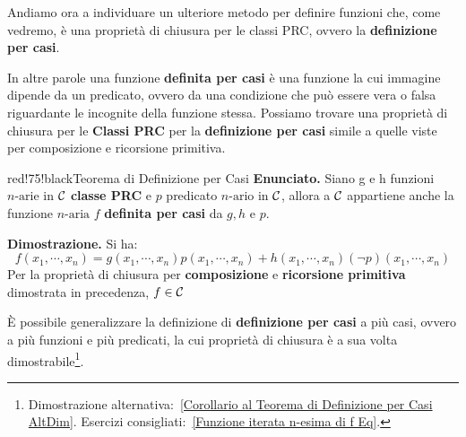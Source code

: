 Andiamo ora a individuare un ulteriore metodo per definire funzioni che, come vedremo, è una proprietà di chiusura per le classi PRC, ovvero la \textbf{definizione per casi}.


In altre parole una funzione \textbf{definita per casi} è una funzione la cui immagine dipende da un predicato, ovvero da una condizione che può essere vera o falsa riguardante le incognite della funzione stessa.
Possiamo trovare una proprietà di chiusura per le \textbf{Classi PRC} per la \textbf{definizione per casi} simile a quelle viste per composizione e ricorsione primitiva.

\begin{halfframedbox}{red!75!black}{Teorema di Definizione per Casi}\label{Definizione per Casi Teorema}
  \textbf{Enunciato.} Siano g e h funzioni \(n\text{-arie}\) in \(\mathcal{C}\) \textbf{classe PRC} e \(p\) predicato \(n\text{-ario}\) in \(\mathcal{C}\), allora a \(\mathcal{C}\) appartiene anche la funzione \(n\text{-aria}\) \(f\) \textbf{definita per casi} da \(g,h\) e \(p\).

  \begin{center}
    \textcolor{red!75!black}{\hdashrule[0.5ex]{18cm}{1pt}{3mm 3pt 1mm 2pt}}
  \end{center}

  \textbf{Dimostrazione.} Si ha:
  \begin{equation}
    f(x_1,\cdots,x_n)=g(x_1,\cdots,x_n)p(x_1,\cdots,x_n)+h(x_1,\cdots,x_n)(\neg p)(x_1,\cdots,x_n)
  \end{equation}
  Per la proprietà di chiusura per \textbf{composizione} e \textbf{ricorsione primitiva} dimostrata in precedenza, \(f\in\mathcal{C}\)
\end{halfframedbox}

È possibile generalizzare la definizione di \textbf{definizione per casi} a più casi, ovvero a più funzioni e più predicati, la cui proprietà di chiusura è  a sua volta dimostrabile\footnote{Dimostrazione alternativa:~\ref{Corollario al Teorema di Definizione per Casi AltDim}. Esercizi consigliati:~\ref{Funzione iterata n-esima di f Eq}.}.

